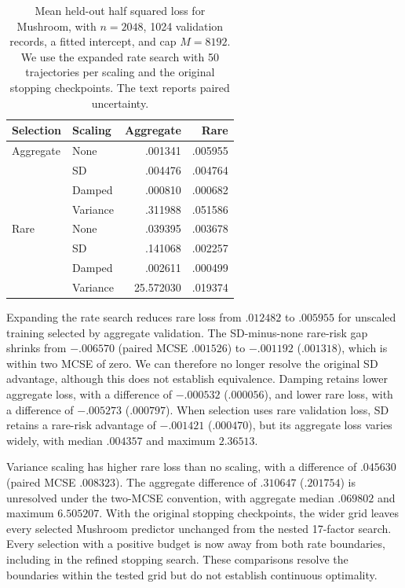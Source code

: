 \begin{table}[t]
 \centering
 \begin{tabular}{llrr}
  \toprule
  Selection & Scaling  & Aggregate &    Rare \\
  \midrule
  Aggregate & None     &   .001341 & .005955 \\
            & SD       &   .004476 & .004764 \\
            & Damped   &   .000810 & .000682 \\
            & Variance &   .311988 & .051586 \\
  Rare      & None     &   .039395 & .003678 \\
            & SD       &   .141068 & .002257 \\
            & Damped   &   .002611 & .000499 \\
            & Variance & 25.572030 & .019374 \\
  \bottomrule
 \end{tabular}
 \caption{
  Mean held-out half squared loss for Mushroom, with $n = 2048$, 1024 validation
  records, a fitted intercept, and cap $M = 8192$. We use the expanded rate
  search with 50 trajectories per scaling and the original stopping checkpoints.
  The text reports paired uncertainty.
 }
 \label{tab:conference-mushroom}
\end{table}

Expanding the rate search reduces rare loss from $.012482$ to $.005955$ for
unscaled training selected by aggregate validation. The SD-minus-none rare-risk
gap shrinks from $-.006570$ (paired MCSE $.001526$) to $-.001192$ ($.001318$),
which is within two MCSE of zero. We can therefore no longer resolve the
original SD advantage, although this does not establish equivalence. Damping
retains lower aggregate loss, with a difference of $-.000532$ ($.000056$), and
lower rare loss, with a difference of $-.005273$ ($.000797$). When selection
uses rare validation loss, SD retains a rare-risk advantage of $-.001421$
($.000470$), but its aggregate loss varies widely, with median $.004357$ and
maximum $2.36513$.

Variance scaling has higher rare loss than no scaling, with a difference of
$.045630$ (paired MCSE $.008323$). The aggregate difference of $.310647$
($.201754$) is unresolved under the two-MCSE convention, with aggregate median
$.069802$ and maximum $6.505207$. With the original stopping checkpoints, the
wider grid leaves every selected Mushroom predictor unchanged from the nested
17-factor search. Every selection with a positive budget is now away from both
rate boundaries, including in the refined stopping search. These comparisons
resolve the boundaries within the tested grid but do not establish continuous
optimality.


